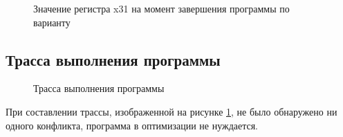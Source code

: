 \begin{figure}[ph!]
    \caption{Значение регистра x31 на момент завершения программы по варианту}
\end{figure}


\clearpage
\subsection{Трасса выполнения программы}

\begin{figure}[h]
    \centering
    
    \caption{Трасса выполнения программы}
    \label{fig:trace}
\end{figure}

При составлении трассы, изображенной на рисунке \ref{fig:trace},
не было обнару\-жено ни одного конфликта, программа в оптимизации не
нуждается.
